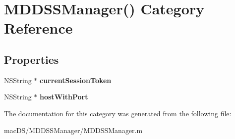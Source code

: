 \hypertarget{category_m_d_d_s_s_manager_07_08}{\section{M\-D\-D\-S\-S\-Manager() Category Reference}
\label{category_m_d_d_s_s_manager_07_08}
}
\subsection*{Properties}
\begin{DoxyCompactItemize}
\item 
\hypertarget{category_m_d_d_s_s_manager_07_08_acd6f2ce4c0742afdee96a2cbdb4bb15c}{N\-S\-String $\ast$ {\bfseries current\-Session\-Token}}\label{category_m_d_d_s_s_manager_07_08_acd6f2ce4c0742afdee96a2cbdb4bb15c}

\item 
\hypertarget{category_m_d_d_s_s_manager_07_08_a7e904d5d9bc487f3560f9cd61429f698}{N\-S\-String $\ast$ {\bfseries host\-With\-Port}}\label{category_m_d_d_s_s_manager_07_08_a7e904d5d9bc487f3560f9cd61429f698}

\end{DoxyCompactItemize}


The documentation for this category was generated from the following file\-:\begin{DoxyCompactItemize}
\item 
mac\-D\-S/\-M\-D\-D\-S\-S\-Manager/M\-D\-D\-S\-S\-Manager.\-m\end{DoxyCompactItemize}
